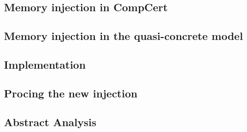 \label{sec:meminj}
\subsection{Memory injection in CompCert}
\subsection{Memory injection in the quasi-concrete model}
\subsection{Implementation}
\subsection{Procing the new injection}
\subsection{Abstract Analysis}

